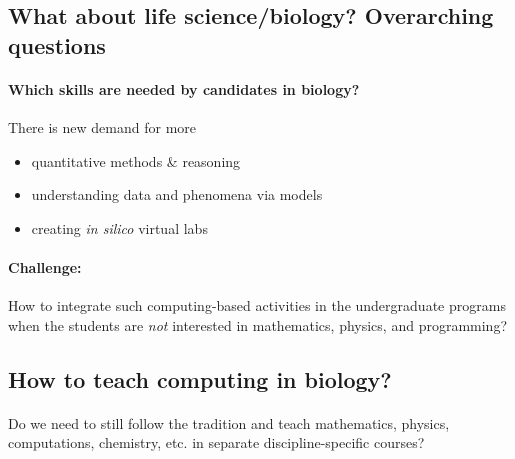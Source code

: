 \documentclass[%
twoside,                 %
final,                   %
10pt]{article}
\begin{document}
\noindent




\subsection*{What about life science/biology? Overarching questions}


\paragraph{Which skills are needed by candidates in biology?}
There is new demand for more

\begin{itemize}
  \item quantitative methods {\&} reasoning

  \item understanding data and phenomena via models

  \item creating \emph{in silico} virtual labs
\end{itemize}

\noindent




\paragraph{Challenge:}
How to integrate such computing-based activities in the undergraduate programs
when the students are \emph{not} interested in mathematics, physics, and
programming?



\subsection*{How to teach computing in biology?}


\paragraph{}
Do we need to still follow the tradition and teach mathematics, physics, computations, chemistry, etc. in separate discipline-specific courses?
\end{document}
